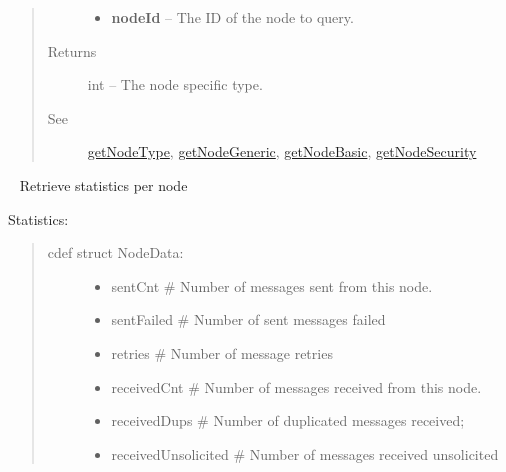 \documentclass[letterpaper,10pt,english]{sphinxmanual}
\begin{document}
\begin{fulllineitems}
\begin{fulllineitems}
\begin{quote}
\begin{description}
\begin{itemize}
\item {} 
\textbf{nodeId} -- The ID of the node to query.

\end{itemize}

\item[{Returns}] \leavevmode
int -- The node specific type.

\item[{See}] \leavevmode
{\hyperref[libopenzwave:getnodetype]{getNodeType}}, {\hyperref[libopenzwave:getnodegeneric]{getNodeGeneric}}, {\hyperref[libopenzwave:getnodebasic]{getNodeBasic}}, {\hyperref[libopenzwave:getnodesecurity]{getNodeSecurity}}

\end{description}\end{quote}

\end{fulllineitems}


\begin{fulllineitems}
\label{libopenzwave:libopenzwave.PyManager.getNodeStatistics}~\label{libopenzwave:getnodestatistics}
Retrieve statistics per node

Statistics:
\begin{quote}
\begin{description}
\item[{cdef struct NodeData:}] \leavevmode\begin{itemize}
\item {} 
sentCnt                              \# Number of messages sent from this node.

\item {} 
sentFailed                           \# Number of sent messages failed

\item {} 
retries                                \# Number of message retries

\item {} 
receivedCnt                        \# Number of messages received from this node.

\item {} 
receivedDups                      \# Number of duplicated messages received;

\item {} 
receivedUnsolicited             \# Number of messages received unsolicited


\end{itemize}
\end{description}
\end{quote}
\end{fulllineitems}
\end{fulllineitems}
\end{document}

